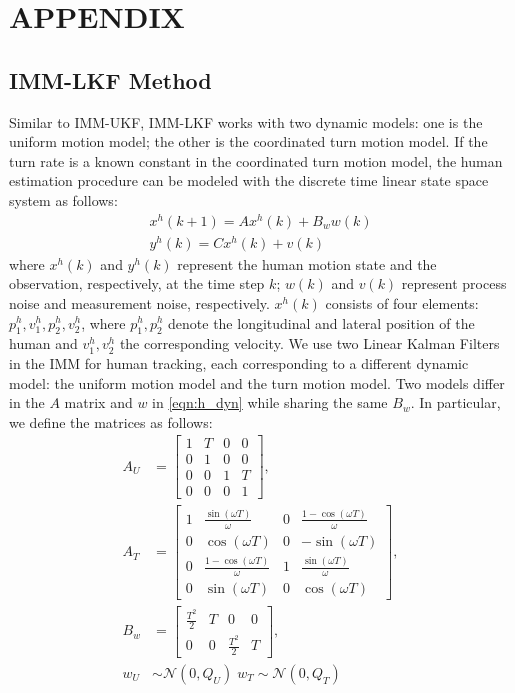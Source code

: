 \documentclass[letterpaper, 10 pt, conference]{ieeeconf}
\begin{document}
	
	\section*{APPENDIX}
	\subsection{IMM-LKF Method}
	Similar to IMM-UKF, IMM-LKF works with two dynamic models: one is the uniform motion model; the other is the coordinated turn motion model. If the turn rate is a known constant in the coordinated turn motion model, the human estimation procedure can be modeled with the discrete time linear state space system as follows:
	\begin{subequations}
		\begin{align}
		x^h(k+1) = Ax^h(k)+B_ww(k)\label{eqn:h_dyn}\\
		y^h(k)=Cx^h(k)+v(k)\label{eqn:observation}
		\end{align}
	\end{subequations}
	where $x^h(k)$ and $y^h(k)$ represent the human motion state and the observation, respectively, at the time step $k$; $w(k)$ and $v(k)$ represent process noise and measurement noise, respectively.
	$x^h(k)$ consists of four elements: $p^h_1,v^h_1,p^h_2,v^h_2$, where $p^h_1,p^h_2$ denote the longitudinal and lateral position of the human and $v^h_1,v^h_2$ the corresponding velocity.
	We use two Linear Kalman Filters in the IMM for human tracking, each corresponding to a different dynamic model: the uniform motion model and the turn motion model.
	Two models differ in the $A$ matrix and $w$ in \cref{eqn:h_dyn} while sharing the same $B_w$.
	In particular, we define the matrices as follows:
	\begin{subequations}
		\begin{align*}
		A_U&=\left[
		\begin{array}{cccc}
		1& T& 0& 0\\
		0& 1& 0& 0\\
		0& 0& 1& T\\
		0& 0& 0& 1
		\end{array}\right],\\
		A_T&=\left[
		\begin{array}{cccc}
		1& \frac{\sin(\omega T)}{\omega}& 0& \frac{1-\cos(\omega T)}{\omega}\\
		0& \cos(\omega T)& 0& -\sin(\omega T)\\
		0& \frac{1-\cos(\omega T)}{\omega}& 1& \frac{\sin(\omega T)}{\omega}\\
		0& \sin(\omega T)& 0& \cos(\omega T)
		\end{array}\right],\\
		B_w&=\left[
		\begin{array}{cccc}
		\frac{T^2}{2}& T& 0& 0\\
		0& 0& \frac{T^2}{2}& T
		\end{array}\right],\\
		w_U&\sim\mathcal{N}(0,Q_U)\; w_T\sim\mathcal{N}(0,Q_T)
		\end{align*}
	\end{subequations}
\end{document}
